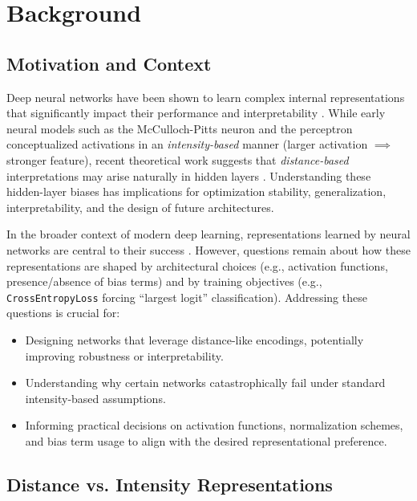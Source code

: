\section{Background}

\subsection{Motivation and Context}
Deep neural networks have been shown to learn complex internal representations that significantly impact their performance and interpretability \cite{goodfellow2016deep, lipton2018mythos}. While early neural models such as the McCulloch-Pitts neuron \cite{mcculloch1943logical} and the perceptron \cite{rosenblatt1958perceptron} conceptualized activations in an \emph{intensity-based} manner (larger activation $\implies$ stronger feature), recent theoretical work suggests that \emph{distance-based} interpretations may arise naturally in hidden layers \cite{oursland2024}. Understanding these hidden-layer biases has implications for optimization stability, generalization, interpretability, and the design of future architectures.

In the broader context of modern deep learning, representations learned by neural networks are central to their success \cite{schmidhuber2015deep}. However, questions remain about how these representations are shaped by architectural choices (e.g., activation functions, presence/absence of bias terms) and by training objectives (e.g., \texttt{CrossEntropyLoss} forcing “largest logit” classification). Addressing these questions is crucial for:
\begin{itemize}
    \item Designing networks that leverage distance-like encodings, potentially improving robustness or interpretability.
    \item Understanding why certain networks catastrophically fail under standard intensity-based assumptions.
    \item Informing practical decisions on activation functions, normalization schemes, and bias term usage to align with the desired representational preference.
\end{itemize}

\subsection{Distance vs. Intensity Representations}


